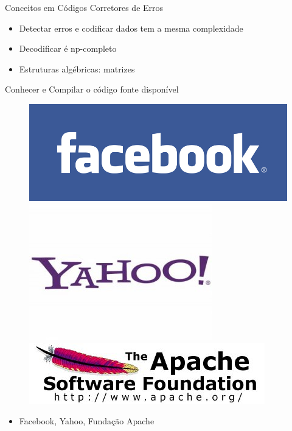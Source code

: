   \begin{frame}{Conceitos em Códigos Corretores de Erros}
     \begin{itemize}
        \item<1-> Detectar erros e codificar dados tem a mesma complexidade 
        \item<2-> Decodificar é np-completo
        \item<3-> Estruturas algébricas: matrizes
     \end{itemize}
  \end{frame}

  \begin{frame}{Conhecer e Compilar o código fonte disponível}
   \begin{figure}[hb]
     \centering
     \includegraphics[scale=0.3]{facebook-logo.jpg}
     \includegraphics[scale=0.2]{yahoo-logo-300x224.jpg}
     \includegraphics[scale=0.2]{asf-logo.jpg}
     \label{fig11:fb}
   \end{figure}
     \begin{itemize}
        \item<1-> Facebook, Yahoo, Fundação Apache

\end{itemize}
\end{frame}

